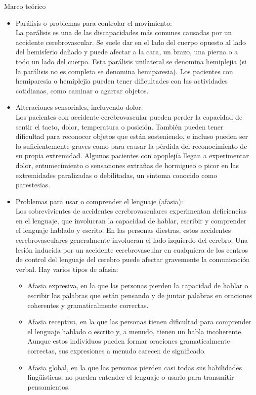 \begin{thesischapter}{1} {Marco teórico}
    \begin{itemize}
        \item Parálisis o problemas para controlar el movimiento: \\
        La parálisis es una de las discapacidades más comunes causadas por un accidente cerebrovascular. Se suele dar en el lado del cuerpo opuesto al lado del hemisferio dañado y puede afectar a la cara, un brazo, una pierna o a todo un lado del cuerpo. Esta parálisis unilateral se denomina hemiplejia (si la parálisis no es completa se denomina hemiparesia). Los pacientes con hemiparesia o hemiplejia pueden tener dificultades con las actividades cotidianas, como caminar o agarrar objetos.~\cite{cuidadosalpacienteadulto}

        \item Alteraciones sensoriales, incluyendo dolor: \\
        Los pacientes con accidente cerebrovascular pueden perder la capacidad de sentir el tacto, dolor, temperatura o posición. También pueden tener dificultad para reconocer objetos que están sosteniendo, e incluso pueden ser lo suficientemente graves como para causar la pérdida del reconocimiento de su propia extremidad. Algunos pacientes con apoplejía llegan a experimentar dolor, entumecimiento o sensaciones extrañas de hormigueo o picor en las extremidades paralizadas o debilitadas, un síntoma conocido como parestesias.~\cite{post-strok}
        
        \item Problemas para usar o comprender el lenguaje (afasia): \\
        Los sobrevivientes de accidentes cerebrovasculares experimentan deficiencias en el lenguaje, que involucran la capacidad de hablar, escribir y comprender el lenguaje hablado y escrito. En las personas diestras, estos accidentes cerebrovasculares generalmente involucran el lado izquierdo del cerebro. Una lesión inducida por un accidente cerebrovascular en cualquiera de los centros de control del lenguaje del cerebro puede afectar gravemente la comunicación verbal. Hay varios tipos de afasia:~\cite{post-strok}

        \begin{itemize}
            \item Afasia expresiva, en la que las personas pierden la capacidad de hablar o escribir las palabras que están pensando y de juntar palabras en oraciones coherentes y gramaticalmente correctas.
            \item Afasia receptiva, en la que las personas tienen dificultad para comprender el lenguaje hablado o escrito y, a menudo, tienen un habla incoherente. Aunque estos individuos pueden formar oraciones gramaticalmente correctas, sus expresiones a menudo carecen de significado.
            \item Afasia global, en la que las personas pierden casi todas sus habilidades lingüísticas; no pueden entender el lenguaje o usarlo para transmitir pensamientos.  
        \end{itemize}


\end{itemize}
\end{thesischapter}
